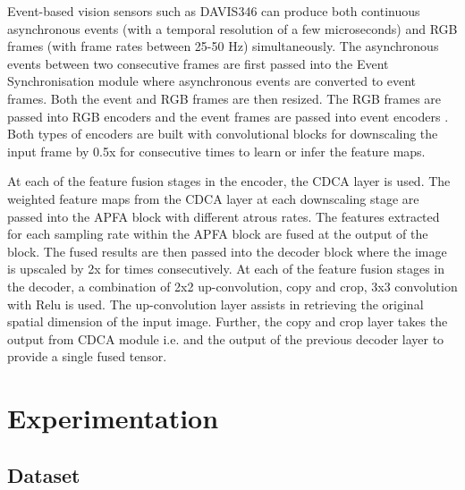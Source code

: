 \documentclass[lettersize,journal]{IEEEtran}
\begin{document}
Event-based vision sensors such as DAVIS346 can produce both continuous asynchronous events (with a temporal resolution of a few microseconds) and RGB frames (with frame rates between 25-50 Hz) simultaneously. The asynchronous events between two consecutive frames are first passed into the Event Synchronisation module where asynchronous events are converted to event frames. Both the event and RGB frames are then resized. The RGB frames are passed into RGB encoders  and the event frames are passed into event encoders . Both types of encoders are built with convolutional blocks for downscaling the input frame by 0.5x for  consecutive times to learn or infer the feature maps. 

At each of the  feature fusion stages in the encoder, the CDCA layer is used. The weighted feature maps from the CDCA layer at each downscaling stage are passed into the APFA block with different atrous rates. The features extracted for each sampling rate within the APFA block are fused at the output of the block. The fused results are then passed into the decoder block where the image is upscaled by 2x for  times consecutively. At each of the   feature fusion stages in the decoder, a combination of 2x2 up-convolution, copy and crop, 3x3 convolution with Relu is used. The up-convolution layer assists in retrieving the original spatial dimension of the input image. Further, the copy and crop layer takes the output from CDCA module i.e.  and the output of the previous decoder layer to provide a single fused tensor.  











\section{{Experimentation}}
\label{section: Experimental Results}

\subsection{\textbf{Dataset}}
\end{document}
